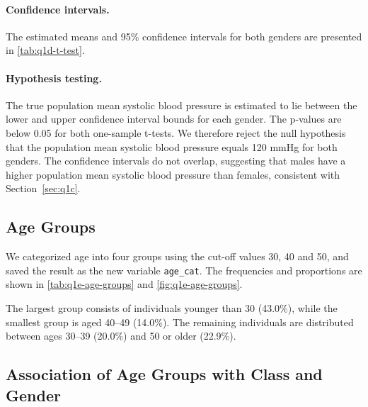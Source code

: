 \paragraph{Confidence intervals.}
The estimated means and 95\% confidence intervals for both genders are presented in \autoref{tab:q1d-t-test}.

\paragraph{Hypothesis testing.}
The true population mean systolic blood pressure is estimated to lie between the lower and upper confidence interval bounds for each gender.
The p-values are below 0.05 for both one-sample t-tests.
We therefore reject the null hypothesis that the population mean systolic blood pressure equals 120 mmHg for both genders.
The confidence intervals do not overlap, suggesting that males have a higher population mean systolic blood pressure than females, consistent with Section~\ref{sec:q1c}.


\subsection{Age Groups}\label{sec:q1e}

We categorized age into four groups using the cut-off values 30, 40 and 50, and saved the result as the new variable \texttt{age\_cat}.
The frequencies and proportions are shown in \autoref{tab:q1e-age-groups} and \autoref{fig:q1e-age-groups}.

The largest group consists of individuals younger than 30 (43.0\%), while the smallest group is aged 40--49 (14.0\%).
The remaining individuals are distributed between ages 30--39 (20.0\%) and 50 or older (22.9\%).

\subsection{Association of Age Groups with Class and Gender}\label{sec:q1f}

